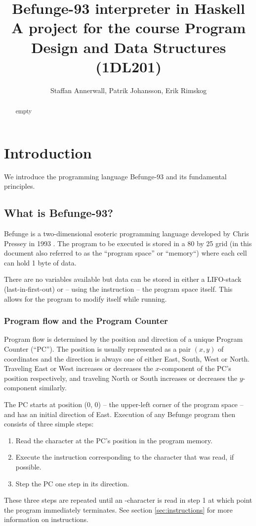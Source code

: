 \documentclass[12pt, a4paper]{article}
\title{Befunge-93 interpreter in Haskell\\
\vspace{5pt}
\small{A project for the course Program Design and Data Structures (1DL201)}}
\author{Staffan Annerwall, Patrik Johansson, Erik Rimskog}
\begin{document}
\maketitle

\begin{abstract}
empty
\end{abstract}

\newpage

\tableofcontents

\newpage

\section{Introduction}
We introduce the programming language Befunge-93 and its fundamental principles.
\label{sec:intro}

\subsection{What is Befunge-93?}
\label{sec:whatis}

Befunge is a two-dimensional esoteric programming language developed by Chris Pressey in 1993 \cite{esolangs}. The program to be executed is stored in a 80 by 25 grid (in this document also referred to as the “program space” or “memory“) where each cell can hold 1 byte of data.

There are no variables available but data can be stored in either a LIFO-stack (last-in-first-out) or -- using the  instruction -- the program space itself. This allows for the program to modify itself while running.

\subsubsection{Program flow and the Program Counter}
\label{sec:pc}

Program flow is determined by the position and direction of a unique Program Counter (“PC”). The position is usually represented as a pair $(x, y)$ of coordinates and the direction is always one of either East, South, West or North. Traveling East or West increases or decreases the $x$-component of the PC's position respectively, and traveling North or South increases or decreases the $y$-component similarly.

The PC starts at position (0, 0) -- the upper-left corner of the program space -- and has an initial direction of East. Execution of any Befunge program then consists of three simple steps:
\begin{enumerate}

\item Read the character at the PC's position in the program memory.
\item Execute the instruction corresponding to the character that was read, if possible.
\item Step the PC one step in its direction.

\end{enumerate}
These three steps are repeated until an -character is read in step 1 at which point the program immediately terminates. See section \ref{sec:instructions} for more information on instructions.
\end{document}
